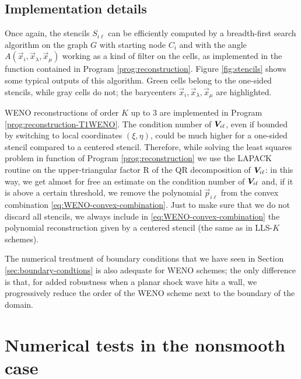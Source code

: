 \subsection*{Implementation details}
Once again, the stencils $S_{i\ell}$ can be efficiently computed
by a breadth-first search algorithm on the graph $G$ with starting node
$C_i$ and with the angle $A(\vec{x}_i,\vec{x}_\lambda,\vec{x}_\mu)$
working as a kind of filter on the cells, as implemented in the
 function  contained in
Program \ref{prog:reconstruction}.
Figure \ref{fig:stencils} shows some typical outputs of this algorithm.
Green cells belong to the one-sided stencils, while gray cells do not;
the barycenters $\vec{x}_i, \vec{x}_\lambda, \vec{x}_\mu$ are highlighted.

WENO reconstructions of order $K$ up to 3 are implemented in
Program \ref{prog:reconstruction-T1WENO}. The condition number
of $\bm{V}_{i\ell}$, even if bounded by switching to local coordinates
$(\xi,\eta)$, could be much higher for a one-sided stencil compared to
a centered stencil. Therefore, while solving the least squares problem
in function  of Program
\ref{prog:reconstruction} we use the LAPACK routine 
on the upper-triangular factor R of the QR decomposition
of $\bm{V}_{i\ell}$: in this way, we get almost for free an estimate
on the condition number of $\bm{V}_{i\ell}$ and, if it is above
a certain threshold, we remove the polynomial $\vec{p}_{i\ell}$ from
the convex combination \eqref{eq:WENO-convex-combination}.
Just to make sure that we do not discard all stencils, we always include
in \eqref{eq:WENO-convex-combination} the polynomial reconstruction
given by a centered stencil (the same as in LLS-$K$ schemes).

The numerical treatment of boundary conditions that we have
seen in Section \ref{sec:boundary-condtions} is also adequate
for WENO schemes; the only difference is that, for added robustness
when a planar shock wave hits a wall, we progressively reduce the order
of the WENO scheme next to the boundary of the domain.

\section{Numerical tests in the nonsmooth case}

